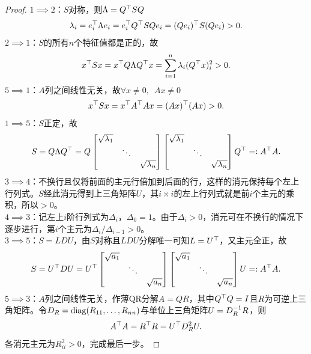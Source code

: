 \begin{proof}
	$1 \implies 2$：$S$对称，则$\Lambda = Q^\top SQ$
	\[
		\lambda_i = e_i^\top \Lambda e_i = e_i^\top Q^\top SQe_i = (Qe_i)^\top S(Qe_i) > 0.
	\]
	$2 \implies 1$：$S$的所有$n$个特征值都是正的，故
	\begin{equation}\label{eq:la-spectral-quadratic-form}
		x^\top Sx = x^\top Q\Lambda Q^\top x = \sum_{i=1}^n\lambda_i(Q^\top x)^2_i > 0.
	\end{equation}
	$5 \implies 1$：$A$列之间线性无关，故$\forall x \neq 0,\enspace Ax \neq 0$
	\[
		x^\top Sx = x^\top A^\top Ax = (Ax)^\top(Ax) > 0.
	\]
	$1 \implies 5$：$S$正定，故
	\[
		S = Q\Lambda Q^\top = Q\begin{bmatrix}
			\sqrt{\lambda_1}\\ &\ddots\\ &&\sqrt{\lambda_n}
		\end{bmatrix}\begin{bmatrix}
			\sqrt{\lambda_1}\\ &\ddots\\ &&\sqrt{\lambda_n}
		\end{bmatrix}Q^\top =: A^\top A.
	\]
	$3 \implies 4$：不换行且仅将前面的主元行倍加到后面的行，这样的消元保持每个左上行列式。$S$经此消元得到上三角矩阵$U$，其$i \times i$的左上行列式就是前$i$个主元的乘积，所以$> 0$。\\
	$4 \implies 3$：记左上$i$阶行列式为$\Delta_i$，$\Delta_0 = 1$。由于$\Delta_i > 0$，消元可在不换行的情况下逐步进行，第$i$个主元为$\Delta_i/\Delta_{i-1} > 0$。\\
	$3 \implies 5$：$S = LDU$，由$S$对称且$LDU$分解唯一可知$L = U^\top$，又主元全正，故
	\[
		S = U^\top DU = U^\top\begin{bmatrix}
			\sqrt{a_1}\\ &\ddots\\ &&\sqrt{a_n}
		\end{bmatrix}\begin{bmatrix}
			\sqrt{a_1}\\ &\ddots\\ &&\sqrt{a_n}
		\end{bmatrix}U =: A^\top A.
	\]
	$5 \implies 3$：$A$列之间线性无关，作薄QR分解$A = QR$，其中$Q^\top Q = I$且$R$为可逆上三角矩阵。令$D_R = \operatorname{diag}(R_{11},\ldots,R_{nn})$与单位上三角矩阵$U = D_R^{-1} R$，则
	\[
		A^\top A = R^\top R = U^\top D_R^2U.
	\]
	各消元主元为$R_{ii}^2 > 0$，完成最后一步。
\end{proof}

